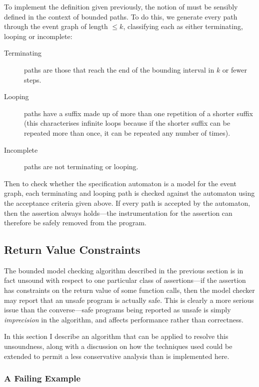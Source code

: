 To implement the definition given previously, the notion of
 must be sensibly defined in the context of
bounded paths. To do this, we generate every path through the event
graph of length $\leq k$, classifying each as either terminating,
looping or incomplete:
\begin{description}
  \item[Terminating] paths are those that reach the end of the bounding
    interval in $k$ or fewer steps.
  \item[Looping] paths have a suffix made up of more than one
    repetition of a shorter suffix (this characterises infinite loops
    because if the shorter suffix can be repeated more than once, it can
    be repeated any number of times).
  \item[Incomplete] paths are not terminating or looping.
\end{description}

Then to check whether the specification automaton is a model for the
event graph, each terminating and looping path is checked against the
automaton using the acceptance criteria given above. If every path is
accepted by the automaton, then the assertion always holds---the
instrumentation for the assertion can therefore be safely removed from
the program.

\subsection{Return Value Constraints} \label{sec:rvc}

The bounded model checking algorithm described in the previous section
is in fact unsound with respect to one particular class of
assertions---if the assertion has constraints on the return value of
some function calls, then the model checker may report that an unsafe
program is actually safe. This is clearly a more serious issue than the
converse---safe programs being reported as unsafe is simply
\emph{imprecision} in the algorithm, and affects performance rather than
correctness.

In this section I describe an algorithm that can be applied to resolve
this unsoundness, along with a discussion on how the techniques used
could be extended to permit a less conservative analysis than is
implemented here.

\subsubsection{A Failing Example}

